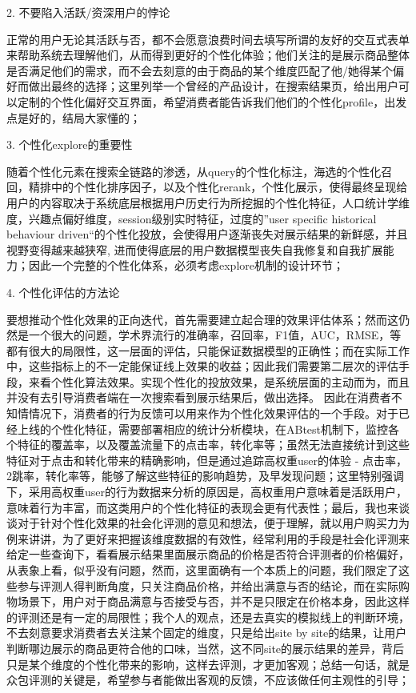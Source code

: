 2. 不要陷入活跃/资深用户的悖论

正常的用户无论其活跃与否，都不会愿意浪费时间去填写所谓的友好的交互式表单来帮助系统去理解他们，从而得到更好的个性化体验；他们关注的是展示商品整体是否满足他们的需求，而不会去刻意的由于商品的某个维度匹配了他/她得某个偏好而做出最终的选择；这里列举一个曾经的产品设计，在搜索结果页，给出用户可以定制的个性化偏好交互界面，希望消费者能告诉我们他们的个性化profile，出发点是好的，结局大家懂的；

3. 个性化explore的重要性

随着个性化元素在搜索全链路的渗透，从query的个性化标注，海选的个性化召回，精排中的个性化排序因子，以及个性化rerank，个性化展示，使得最终呈现给用户的内容取决于系统底层根据用户历史行为所挖掘的个性化特征，人口统计学维度，兴趣点偏好维度，session级别实时特征，过度的”user specific historical behaviour driven“的个性化投放，会使得用户逐渐丧失对展示结果的新鲜感，并且视野变得越来越狭窄, 进而使得底层的用户数据模型丧失自我修复和自我扩展能力；因此一个完整的个性化体系，必须考虑explore机制的设计环节；

4. 个性化评估的方法论

要想推动个性化效果的正向迭代，首先需要建立起合理的效果评估体系；然而这仍然是一个很大的问题，学术界流行的准确率，召回率，F1值，AUC，RMSE，等都有很大的局限性，这一层面的评估，只能保证数据模型的正确性；而在实际工作中，这些指标上的不一定能保证线上效果的收益；因此我们需要第二层次的评估手段，来看个性化算法效果。实现个性化的投放效果，是系统层面的主动而为，而且并没有去引导消费者端在一次搜索看到展示结果后，做出选择。 因此在消费者不知情情况下，消费者的行为反馈可以用来作为个性化效果评估的一个手段。对于已经上线的个性化特征，需要部署相应的统计分析模块，在ABtest机制下，监控各个特征的覆盖率，以及覆盖流量下的点击率，转化率等；虽然无法直接统计到这些特征对于点击和转化带来的精确影响，但是通过追踪高权重user的体验 - 点击率，2跳率，转化率等，能够了解这些特征的影响趋势，及早发现问题；这里特别强调下，采用高权重user的行为数据来分析的原因是，高权重用户意味着是活跃用户，意味着行为丰富，而这类用户的个性化特征的表现会更有代表性；最后，我也来谈谈对于针对个性化效果的社会化评测的意见和想法，便于理解，就以用户购买力为例来讲讲，为了更好来把握该维度数据的有效性，经常利用的手段是社会化评测来给定一些查询下，看看展示结果里面展示商品的价格是否符合评测者的价格偏好，从表象上看，似乎没有问题，然而，这里面确有一个本质上的问题，我们限定了这些参与评测人得判断角度，只关注商品价格，并给出满意与否的结论，而在实际购物场景下，用户对于商品满意与否接受与否，并不是只限定在价格本身，因此这样的评测还是有一定的局限性；我个人的观点，还是去真实的模拟线上的判断环境，不去刻意要求消费者去关注某个固定的维度，只是给出site by site的结果，让用户判断哪边展示的商品更符合他的口味，当然，这不同site的展示结果的差异，背后只是某个维度的个性化带来的影响，这样去评测，才更加客观；总结一句话，就是众包评测的关键是，希望参与者能做出客观的反馈，不应该做任何主观性的引导；

